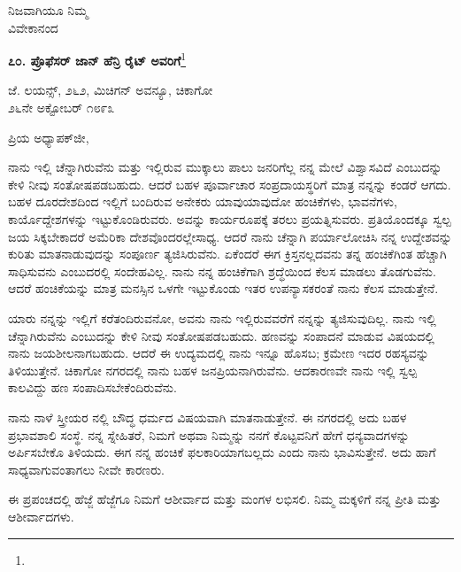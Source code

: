 {\flushright
ನಿಜವಾಗಿಯೂ ನಿಮ್ಮ\\ವಿವೇಕಾನಂದ\par}
\vspace{-0.5cm}

\begin{center}
\textbf{೭೦. ಪ್ರೊಫೆಸರ್ ಜಾನ್ ಹೆನ್ರಿ ರೈಟ್ ಅವರಿಗೆ}\footnote{}
\end{center}

\begin{flushright}
 ಜೆ. ಲಯನ್ಸ್, ೨೬೨, ಮಿಚಿಗನ್ ಅವನ್ಯೂ, ಚಿಕಾಗೋ\\೨೬ನೇ ಅಕ್ಟೋಬರ್ ೧೮೯೩
\end{flushright}

\noindent
ಪ್ರಿಯ ಅಧ್ಯಾಪಕ್‌ಜೀ,

ನಾನು ಇಲ್ಲಿ ಚೆನ್ನಾಗಿರುವೆನು ಮತ್ತು ಇಲ್ಲಿರುವ ಮುಕ್ಕಾಲು ಪಾಲು ಜನರಿಗೆಲ್ಲ ನನ್ನ ಮೇಲೆ ವಿಶ್ವಾಸವಿದೆ ಎಂಬುದನ್ನು ಕೇಳಿ ನೀವು ಸಂತೋಷಪಡಬಹುದು. ಆದರೆ ಬಹಳ ಪೂರ್ವಾಚಾರ ಸಂಪ್ರದಾಯಸ್ಥರಿಗೆ ಮಾತ್ರ ನನ್ನನ್ನು ಕಂಡರೆ ಆಗದು. ಬಹಳ ದೂರದೇಶದಿಂದ ಇಲ್ಲಿಗೆ ಬಂದಿರುವ ಅನೇಕರು ಯಾವುಯಾವುದೋ ಹಂಚಿಕೆಗಳು, ಭಾವನೆಗಳು, ಕಾರ್ಯೊದ್ದೇಶಗಳನ್ನು ಇಟ್ಟುಕೊಂಡಿರುವರು. ಅವನ್ನು ಕಾರ್ಯರೂಪಕ್ಕೆ ತರಲು ಪ್ರಯತ್ನಿಸುವರು. ಪ್ರತಿಯೊಂದಕ್ಕೂ ಸ್ವಲ್ಪ ಜಯ ಸಿಕ್ಕಬೇಕಾದರೆ ಅಮೆರಿಕಾ ದೇಶವೊಂದರಲ್ಲೇಸಾಧ್ಯ. ಆದರೆ ನಾನು ಚೆನ್ನಾಗಿ ಪರ್ಯಾಲೋಚಿಸಿ ನನ್ನ ಉದ್ದೇಶವನ್ನು ಕುರಿತು ಮಾತನಾಡುವುದನ್ನು ಸಂಪೂರ್ಣ ತ್ಯಜಿಸಿರುವೆನು. ಏಕೆಂದರೆ ಈಗ ಕ್ರಿಸ್ತನಲ್ಲದವನು ತನ್ನ ಹಂಚಿಕೆಗಿಂತ ಹೆಚ್ಚಾಗಿ ಸಾಧಿಸುವನು ಎಂಬುದರಲ್ಲಿ ಸಂದೇಹವಿಲ್ಲ. ನಾನು ನನ್ನ ಹಂಚಿಕೆಗಾಗಿ ಶ್ರದ್ಧೆಯಿಂದ ಕೆಲಸ ಮಾಡಲು ತೊಡಗುವೆನು. ಆದರೆ ಹಂಚಿಕೆಯನ್ನು ಮಾತ್ರ ಮನಸ್ಸಿನ ಒಳಗೇ ಇಟ್ಟುಕೊಂಡು ಇತರ ಉಪನ್ಯಾಸಕರಂತೆ ನಾನು ಕೆಲಸ ಮಾಡುತ್ತೇನೆ.

ಯಾರು ನನ್ನನ್ನು ಇಲ್ಲಿಗೆ ಕರೆತಂದಿರುವನೋ, ಅವನು ನಾನು ಇಲ್ಲಿರುವವರೆಗೆ ನನ್ನನ್ನು ತ್ಯಜಿಸುವುದಿಲ್ಲ. ನಾನು ಇಲ್ಲಿ ಚೆನ್ನಾಗಿರುವೆನು ಎಂಬುದನ್ನು ಕೇಳಿ ನೀವು ಸಂತೋಷಪಡಬಹುದು. ಹಣವನ್ನು ಸಂಪಾದನೆ ಮಾಡುವ ವಿಷಯದಲ್ಲಿ ನಾನು ಜಯಶೀಲನಾಗಬಹುದು. ಆದರೆ ಈ ಉದ್ಯಮದಲ್ಲಿ ನಾನು ಇನ್ನೂ ಹೊಸಬ; ಕ್ರಮೇಣ ಇದರ ರಹಸ್ಯವನ್ನು ತಿಳಿಯುತ್ತೇನೆ. ಚಿಕಾಗೋ ನಗರದಲ್ಲಿ ನಾನು ಬಹಳ ಜನಪ್ರಿಯನಾಗಿರುವೆನು. ಆದಕಾರಣವೇ ನಾನು ಇಲ್ಲಿ ಸ್ವಲ್ಪ ಕಾಲವಿದ್ದು ಹಣ ಸಂಪಾದಿಸಬೇಕೆಂದಿರುವೆನು.

\newpage

ನಾನು ನಾಳೆ ಸ್ತ್ರೀಯರ ನಲ್ಲಿ ಬೌದ್ಧ ಧರ್ಮದ ವಿಷಯವಾಗಿ ಮಾತನಾಡುತ್ತೇನೆ. ಈ ನಗರದಲ್ಲಿ ಅದು ಬಹಳ ಪ್ರಭಾವಶಾಲಿ ಸಂಸ್ಥೆ. ನನ್ನ ಸ್ನೇಹಿತರೆ, ನಿಮಗೆ ಅಥವಾ ನಿಮ್ಮನ್ನು ನನಗೆ ಕೊಟ್ಟವನಿಗೆ ಹೇಗೆ ಧನ್ಯವಾದಗಳನ್ನು ಅರ್ಪಿಸಬೇಕೊ ತಿಳಿಯದು. ಈಗ ನನ್ನ ಹಂಚಿಕೆ ಫಲಕಾರಿಯಾಗಬಲ್ಲದು ಎಂದು ನಾನು ಭಾವಿಸುತ್ತೇನೆ. ಅದು ಹಾಗೆ ಸಾಧ್ಯವಾಗುವಂತಾಗಲು ನೀವೇ ಕಾರಣರು.

ಈ ಪ್ರಪಂಚದಲ್ಲಿ ಹೆಜ್ಜೆ ಹೆಜ್ಜೆಗೂ ನಿಮಗೆ ಆಶೀರ್ವಾದ ಮತ್ತು ಮಂಗಳ ಲಭಿಸಲಿ. ನಿಮ್ಮ ಮಕ್ಕಳಿಗೆ ನನ್ನ ಪ್ರೀತಿ ಮತ್ತು ಆಶೀರ್ವಾದಗಳು.

\vspace{-0.3cm}

